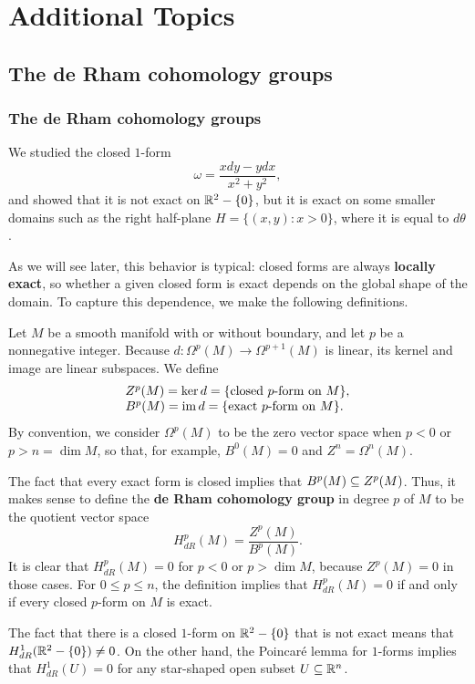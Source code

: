 \chapter{Additional Topics}
\section{The de Rham cohomology groups}
\subsection{The de Rham cohomology groups}
We studied the closed $1$-form
\[\omega=\frac{xdy-ydx}{x^2+y^2},\]
and showed that it is not exact on $\mathbb{R}^2-\{0\}$, but it is exact on some smaller domains such as the right half-plane $H=\{(x,y):x>0\}$, where it is equal to $d\theta$.\par
As we will see later, this behavior is typical: closed forms are always \textbf{locally exact}, so whether a given closed form is exact depends on the global shape of the domain. To capture this dependence, we make the following definitions.\par
Let $M$ be a smooth manifold with or without boundary, and let $p$ be a nonnegative integer. Because $d:\Omega^p(M)\to\Omega^{p+1}(M)$ is linear, its kernel and image are
linear subspaces. We define
\[\begin{array}{l}Z^p(M)=\ker d=\{\text{closed $p$-form on $M$}\},\\
B^p(M)=\mathrm{im}\, d=\{\text{exact $p$-form on $M$}\}.
\end{array}\]
By convention, we consider $\Omega^p(M)$ to be the zero vector space when $p<0$ or $p>n=\dim M$, so that, for example, $B^0(M)=0$ and $Z^n=\Omega^n(M)$.\par
The fact that every exact form is closed implies that $B^p(M)\subseteq Z^p(M)$. Thus, it makes sense to define the \textbf{de Rham cohomology group} in degree $p$ of $M$ to be the quotient vector space
\[H^p_{dR}(M)=\frac{Z^p(M)}{B^p(M)}.\]
It is clear that $H^p_{dR}(M)=0$ for $p<0$ or $p>\dim M$, because $Z^p(M)=0$ in those cases. For $0\leq p\leq n$, the definition implies that $H^p_{dR}(M)=0$ if and only if every closed $p$-form on $M$ is exact.
\begin{example}
The fact that there is a closed $1$-form on $\mathbb{R}^2-\{0\}$ that is not exact means that $H^1_{dR}(\mathbb{R}^2-\{0\})\neq 0$. On the other hand, the Poincar\'e lemma for $1$-forms 
implies that $H^1_{dR}(U)=0$ for any star-shaped open subset $U\subseteq\mathbb{R}^n$.
\end{example}

